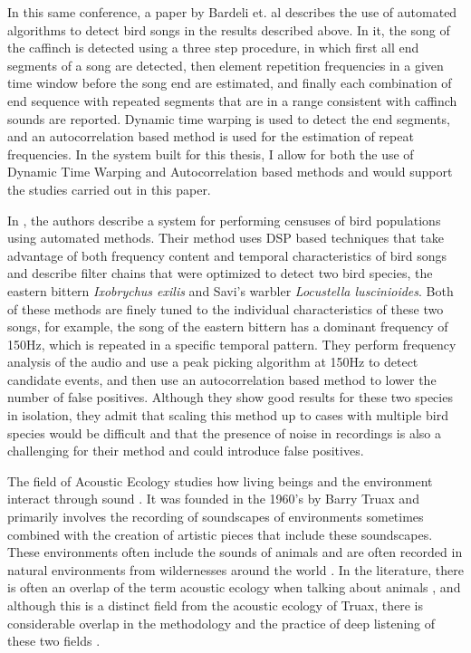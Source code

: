 \documentclass[12pt,oneside]{book}
\begin{document}
In this same conference, a paper by Bardeli et. al
\cite{bardeli2008bird} describes the use of automated algorithms to
detect bird songs in the results described above.  In it, the song of
the caffinch is detected using a three step procedure, in which first
all end segments of a song are detected, then element repetition
frequencies in a given time window before the song end are estimated,
and finally each combination of end sequence with repeated segments
that are in a range consistent with caffinch sounds are reported.
Dynamic time warping is used to detect the end segments, and an
autocorrelation based method is used for the estimation of repeat
frequencies.  In the system built for this thesis, I allow for both
the use of Dynamic Time Warping and Autocorrelation based methods and
would support the studies carried out in this paper.

In \cite{bardeli2010detecting}, the authors describe a system for
performing censuses of bird populations using automated methods.
Their method uses DSP based techniques that take advantage of both
frequency content and temporal characteristics of bird songs and
describe filter chains that were optimized to detect two bird species,
the eastern bittern \textit{Ixobrychus exilis} and Savi's warbler
\textit{Locustella luscinioides}.  Both of these methods are finely
tuned to the individual characteristics of these two songs, for
example, the song of the eastern bittern has a dominant frequency of
150Hz, which is repeated in a specific temporal pattern.  They perform
frequency analysis of the audio and use a peak picking algorithm at
150Hz to detect candidate events, and then use an autocorrelation
based method to lower the number of false positives.  Although they
show good results for these two species in isolation, they admit that
scaling this method up to cases with multiple bird species would be
difficult and that the presence of noise in recordings is also a
challenging for their method and could introduce false positives.

The field of Acoustic Ecology studies how living beings and the
environment interact through sound \cite{wrightson2000introduction}.
It was founded in the 1960's by Barry Truax \cite{truax2001handbook}
and primarily involves the recording of soundscapes of environments
sometimes combined with the creation of artistic pieces
\cite{westerkamp2002linking} that include these soundscapes.  These
environments often include the sounds of animals and are often
recorded in natural environments from wildernesses
\cite{smith2004listening} around the world
\cite{feld1994ethnomusicology}.  In the literature, there is often an
overlap of the term acoustic ecology when talking about animals
\cite{nowacek2005acoustic} \cite{kroodsma1996ecology}, and although
this is a distinct field from the acoustic ecology of Truax, there is
considerable overlap in the methodology and the practice of deep
listening of these two fields \cite{redstrom1998acoustic}.
\end{document}
